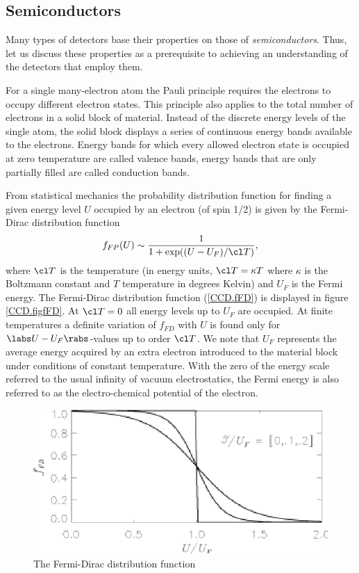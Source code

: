 \subsection{Semiconductors}

Many types of detectors base their properties on those of {\it
  semiconductors}. Thus, let us discuss these properties as a
prerequisite to achieving an understanding of the detectors that
employ them. 

For a single many-electron atom the Pauli principle requires the
electrons to occupy different electron states. This principle also
applies to the total number of electrons in a solid block of
material. Instead of the discrete energy levels of the single atom,
the solid block displays a series of continuous energy bands available
to the electrons. Energy bands for which every allowed electron state
is occupied at zero temperature are called valence bands, energy bands
that are only partially filled are called conduction bands. 

From statistical mechanics the probability distribution function for
finding a given energy level $U$ occupied by an electron (of spin 1/2)
is given by the Fermi-Dirac distribution function
\begin{equation}
  f_{FP}(U) \sim \frac{1}{1+\exp((U-U_F)/\cl T)},
  \label{CCD.fFD}
\end{equation}
where $\cl T$ is the temperature (in energy units, $\cl T = \kappa T$
where $\kappa$ is the Boltzmann constant and $T$ temperature in
degrees Kelvin) and $U_F$ is the Fermi energy. The Fermi-Dirac
distribution function (\ref{CCD.fFD}) is displayed in figure
\ref{CCD.figfFD}. At $\cl T = 0$ all energy levels up to $U_F$ are
occupied. At finite temperatures a definite variation of $f_{FD}$ with
$U$ is found only for $\labs U - U_F \rabs$-values up to order $\cl
T$. We note that $U_F$ represents the average energy acquired by an
extra electron introduced to the material block under conditions of
constant temperature. With the zero of the energy scale referred to the
usual infinity of vacuum electrostatics, the Fermi energy is also
referred to as the electro-chemical potential of the electron.

\begin{figure}[h]
  \centering
	\includegraphics{CCD_fFD.eps}
  \caption{The Fermi-Dirac distribution function}
  \label{fig:CCD.figfFD}
\end{figure}

